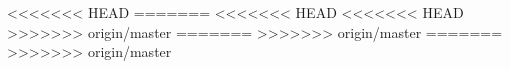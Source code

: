 \documentclass[11pt, a4paper]{article} %
\begin{document}
<<<<<<< HEAD
=======
<<<<<<< HEAD
<<<<<<< HEAD
>>>>>>> origin/master
=======
>>>>>>> origin/master
=======
>>>>>>> origin/master
\begin{table}[ht]
\centering
\caption{Results of the meta-analysis.ES = Effect Size, Q = Test for residual heterogeneity, $I^2$ = residual heterogeneity, Egger's test and the fails-safe number for publication bias testing.} 
{\footnotesize
{}
}
\end{table}

\bigskip

\end{document}
